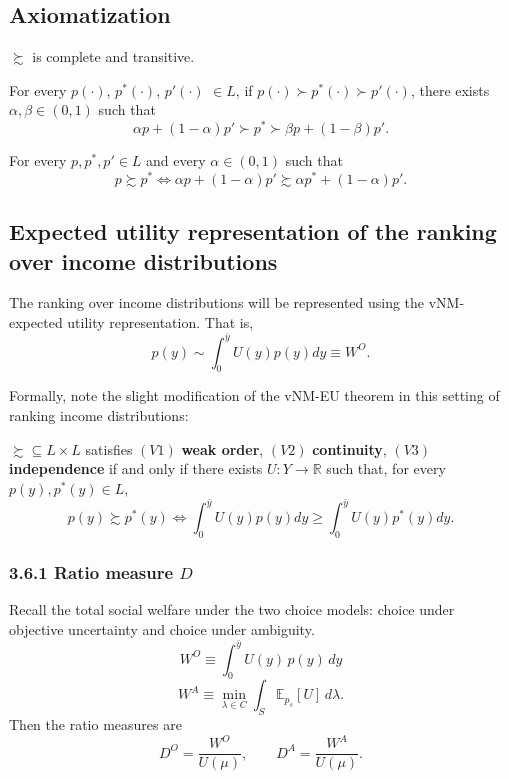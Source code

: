 \documentclass[../../../00-main.tex]{subfiles}
\begin{document}
\subsection*{Axiomatization}

\begin{ax.V}
$\succsim$ is complete and transitive.
\end{ax.V}

\begin{ax.V}[Continuity]
For every $p(\cdot)$, $p^*(\cdot)$, $p'(\cdot)$ $\in L$, if $p(\cdot) \succ p^*(\cdot) \succ p'(\cdot) $, there exists $\alpha, \beta \in (0,1)$ such that 
$$ \alpha p + (1-\alpha)p' \succ p^* \succ \beta p + (1-\beta) p' .$$ 
\end{ax.V}

\begin{ax.V}[Independence]
For every $p,p^*,p' \in L$ and every $\alpha \in (0,1)$ such that 
$$ p \succsim p^* \iff \alpha p + (1-\alpha)p' \succsim \alpha p^* + (1-\alpha)p'. $$
\end{ax.V}

\subsection*{Expected utility representation of the ranking over income distributions}

\par The ranking over income distributions will be represented using the vNM-expected utility representation. That is,
$$ p(y) \sim \int_{0}^{\bar{y}} U(y) p(y) dy \equiv W^{O}. $$

\par Formally, note the slight modification of the vNM-EU theorem in this setting of ranking income distributions:

\begin{tm}
$\succsim \subseteq L \times L$ satisfies $(V1)$ \textbf{weak order}, $(V2)$ \textbf{continuity}, $(V3)$ \textbf{independence} if and only if there exists $U: Y \to \mathbb{R}$ such that, for every $p(y), p^*(y) \in L,$
$$ p(y) \succsim p^*(y) \iff \int_{0}^{\bar{y}} U(y) p(y) dy \geq \int_{0}^{\bar{y}} U(y) p^*(y) dy. $$
\end{tm}

\subsubsection*{3.6.1 Ratio measure $D$}

Recall the total social welfare under the two choice models: choice under objective uncertainty and choice under ambiguity. 
\[
W^{O} \equiv \int_0^{\bar y} U(y)\,p(y)\,dy
\]
\[
W^{A} \equiv \min_{\lambda\in C}\int_S \mathbb{E}_{p_s}[U] \, d\lambda.
\]
Then the ratio measures are
\[
D^{O} = \frac{W^{O}}{U(\mu)},
\qquad
D^{A} = \frac{W^{A}}{U(\mu)}.
\]
\end{document}
